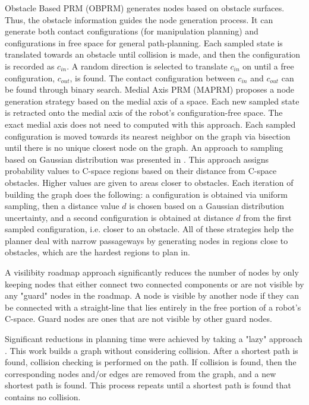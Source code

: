 \documentclass[10pt,conference]{ieeeconf}
\begin{document}
Obstacle Based PRM (OBPRM) \cite{amato1998obprm} generates nodes based on obstacle surfaces. Thus, the obstacle information guides the node generation process. It can generate both contact configurations (for manipulation planning) and configurations in free space for general path-planning. Each sampled state is translated towards an obstacle until collision is made, and then the configuration is recorded as $c_{in}$. A random direction is selected to translate $c_{in}$ on until a free configuration, $c_{out}$, is found. The contact configuration between $c_{in}$ and $c_{out}$ can be found through binary search.
Medial Axis PRM (MAPRM) \cite{wilmarth1999maprm} proposes a node generation strategy based on the medial axis of a space. Each new sampled state is retracted onto the medial axis of the robot's configuration-free space. The exact medial axis does not need to computed with this approach. Each sampled configuration is moved towards its nearest neighbor on the graph via bisection until there is no unique closest node on the graph. An approach to sampling based on Gaussian distribution was presented in \cite{boor1999gaussian}. This approach assigns probability values to C-space regions based on their distance from C-space obstacles. Higher values are given to areas closer to obstacles. Each iteration of building the graph does the following: a configuration is obtained via uniform sampling, then a distance value $d$ is chosen based on a Gaussian distribution uncertainty, and a second configuration is obtained at distance $d$ from the first sampled configuration, i.e. closer to an obstacle. All of these strategies help the planner deal with narrow passageways by generating nodes in regions close to obstacles, which are the hardest regions to plan in.

A visilibity roadmap approach \cite{nissoux1999visibility} significantly reduces the number of nodes by only keeping nodes that either connect two connected components or are not visible by any "guard" nodes in the roadmap. A node is visible by another node if they can be connected with a straight-line that lies entirely in the free portion of a robot's C-space. Guard nodes are ones that are not visible by other guard nodes. 

Significant reductions in planning time were achieved by taking a "lazy" approach \cite{bohlin2000path}. This work builds a graph without considering collision. After a shortest path is found, collision checking is performed on the path. If collision is found, then the corresponding nodes and/or edges are removed from the graph, and a new shortest path is found. This process repeats until a shortest path is found that contains no collision.
\end{document}
